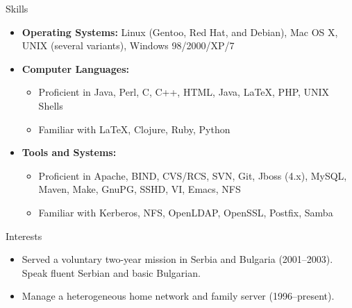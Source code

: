 \documentclass[11pt,oneside]{article}
\newenvironment{ressection}[1]{
	\vspace{4pt}
	{\fontfamily{phv}\selectfont\Large#1}
	\begin{itemize}
	\vspace{3pt}
}{
	\end{itemize}
}
\newcommand{\resitem}[1]{
	\vspace{-4pt}
	\item \begin{flushleft} #1 \end{flushleft}
}
\newcommand{\ressubitem}[1]{
	\vspace{-1pt}
	\item \begin{flushleft} #1 \end{flushleft}
}
\newenvironment{reslist}[1]{
	\resitem{\textbf{#1}}
	\vspace{-5pt}
	\begin{itemize}
}{
	\end{itemize}
}
\begin{document}
\begin{ressection}{Skills}

	\resitem{\textbf{Operating Systems:} Linux (Gentoo, Red Hat, and Debian), Mac OS X, UNIX (several variants), Windows 98/2000/XP/7}

	\begin{reslist}{Computer Languages:}

		\ressubitem{Proficient in Java, Perl, C, C++, HTML, Java, \LaTeX, PHP, UNIX Shells}

		\ressubitem{Familiar with \LaTeX, Clojure, Ruby, Python}

	\end{reslist}

	\begin{reslist}{Tools and Systems:}

		\ressubitem{Proficient in Apache, BIND, CVS/RCS, SVN, Git, Jboss (4.x), MySQL, Maven, Make, GnuPG, SSHD, VI, Emacs, NFS}

		\ressubitem{Familiar with Kerberos, NFS, OpenLDAP, OpenSSL, Postfix, Samba}

	\end{reslist}


\end{ressection}


\begin{ressection}{Interests}

	\resitem{Served a voluntary two-year mission in Serbia and Bulgaria (2001--2003).  Speak fluent Serbian and basic Bulgarian.}

	\resitem{Manage a heterogeneous home network and family server (1996--present).}


\end{ressection}
\end{document}

